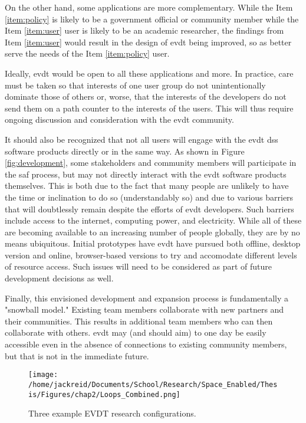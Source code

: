 \documentclass[notitlepage]{article}
\begin{document}
On the other hand, some applications are more complementary. While the Item \ref{item:policy} is likely to be a government official or community member while the Item \ref{item:user} user is likely to be an academic researcher, the findings from Item \ref{item:user} would result in the design of \ac{evdt} being improved, so as better serve the needs of the Item \ref{item:policy} user.

Ideally, \ac{evdt} would be open to all these applications and more. In practice, care must be taken so that interests of one user group do not unintentionally dominate those of others or, worse, that the interests of the developers do not send them on a path counter to the interests of the users. This will thus require ongoing discussion and consideration with the \ac{evdt} community.

It should also be recognized that not all users will engage with the \ac{evdt} \ac{dss} software products directly or in the same way. As shown in Figure \ref{fig:development}, some stakeholders and community members will participate in the \ac{saf} process, but may not directly interact with the \ac{evdt} software products themselves. This is both due to the fact that many people are unlikely to have the time or inclination to do so (understandably so) and due to various barriers that will doubtlessly remain despite the efforts of \ac{evdt} developers. Such barriers include access to the internet, computing power, and electricity. While all of these are becoming available to an increasing number of people globally, they are by no means ubiquitous. Initial prototypes have \ac{evdt} have pursued both offline, desktop version and online, browser-based versions to try and accomodate different levels of resource access. Such issues will need to be considered as part of future development decisions as well.

Finally, this envisioned development and expansion process is fundamentally a "snowball model." Existing team members collaborate with new partners and their communities. This results in additional team members who can then collaborate with others. \ac{evdt} may (and should aim) to one day be easily accessible even in the absence of connections to existing community members, but that is not in the immediate future.

\clearpage
\begin{figure}[t]
	\centering
	\texttt{[image: /home/jackreid/Documents/School/Research/Space\_Enabled/Thesis/Figures/chap2/Loops\_Combined.png]}
	\caption{Three example EVDT research configurations.}
	\label{fig:combo}
\end{figure}
\clearpage
\end{document}
